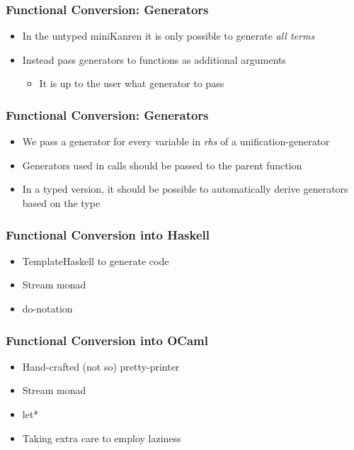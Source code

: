 \documentclass[xcolor=table]{beamer}
\begin{document}
\begin{frame}[fragile]
  \frametitle{Functional Conversion: Generators}
\begin{itemize}
  \item In the untyped miniKanren it is only possible to generate \emph{all terms}
  \item Instead pass generators to functions as additional arguments
  \begin{itemize}
    \item It is up to the user what generator to pass
  \end{itemize}
\end{itemize}

\end{frame}

\begin{frame}[fragile]
  \frametitle{Functional Conversion: Generators}
    \begin{itemize}
        \item We pass a generator for every variable in \emph{rhs} of a unification-generator
        \item Generators used in calls should be passed to the parent function
        \item In a typed version, it should be possible to automatically derive generators based on the type
    \end{itemize}
    
\end{frame}

\begin{frame}[fragile]
  \frametitle{Functional Conversion into Haskell}
  \begin{itemize}
    \item TemplateHaskell to generate code
    \item Stream monad
    \item do-notation
  \end{itemize}
\end{frame}

\begin{frame}[fragile]
  \frametitle{Functional Conversion into OCaml}
  \begin{itemize}
    \item Hand-crafted (not so) pretty-printer
    \item Stream monad
    \item let*
    \item Taking extra care to employ laziness
  \end{itemize}
\end{frame}
\end{document}
